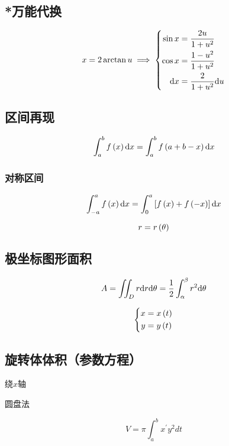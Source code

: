 \documentclass{article}
\begin{document}
\subsection{*万能代换}

\[x=2\arctan u\implies
    \left\{\begin{aligned}
        \sin x & =\frac{2u}{1+u^2}    \\
        \cos x & =\frac{1-u^2}{1+u^2} \\
        \mathrm d x   & =\frac2{1+u^2}\mathrm d u
    \end{aligned}\right.\]

\subsection{区间再现}

\[\int_a^bf\left(x\right)\mathrm d x=\int_a^bf\left(a+b-x\right)\mathrm d x\]

\subsubsection{对称区间}

\[\int_{-a}^af\left(x\right)\mathrm d x=\int_0^a\left[f\left(x\right)+f\left(-x\right)\right]\mathrm d x\]

\begin{definition}[以下极坐标方程中都有]
    \[r=r\left(\theta\right)\]
\end{definition}

\subsection{极坐标图形面积}

\[A=\iint_Dr\mathrm d r\mathrm d\theta=\frac12\int_{\alpha}^{\beta}{r^2\mathrm d\theta}\]

\begin{definition}
    \[\left\{\begin{aligned}
            x & =x\left(t\right) \\
            y & =y\left(t\right)
        \end{aligned}\right.\]
\end{definition}

\subsection{旋转体体积（参数方程）}

绕$x$轴

圆盘法

\[V=\pi\int_a^bx^\prime y^2dt\]
\end{document}
